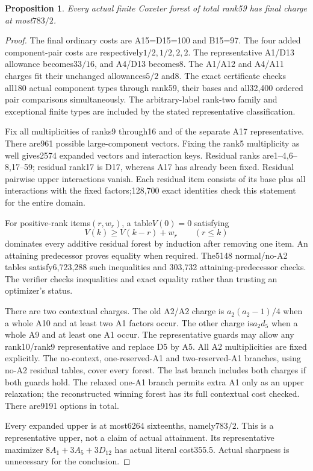\documentclass[11pt]{article}
\newtheorem{proposition}[theorem]{Proposition}
\theoremstyle{remark}\newtheorem{remark}[theorem]{Remark}
\begin{document}
\begin{proposition}\label{prop:finite}
Every actual finite Coxeter forest of total rank59 has final charge
at most$783/2$.
\end{proposition}
\begin{proof}
The final ordinary costs are A15=D15=100 and B15=97. The four added
component-pair costs are respectively$1/2,1/2,2,2$. The representative
A1/D13 allowance becomes$33/16$, and A4/D13 becomes8. The A1/A12 and
A4/A11 charges fit their unchanged allowances$5/2$ and8. The exact
certificate checks all180 actual component types through rank59,
their bases and all32,400 ordered pair comparisons simultaneously.
The arbitrary-label rank-two family and exceptional finite types are
included by the stated representative classification.

Fix all multiplicities of ranks9 through16 and of the separate A17
representative. There are961 possible large-component vectors.
Fixing the rank5 multiplicity as well gives2574 expanded vectors and
interaction keys. Residual ranks are1--4,6--8,17--59; residual rank17
is D17, whereas A17 has already been fixed. Residual pairwise upper
interactions vanish. Each residual item consists of its base plus
all interactions with the fixed factors;128,700 exact identities
check this statement for the entire domain.

For positive-rank items$(r,w_r)$, a table$V(0)=0$ satisfying
\[
 V(k)\geq V(k-r)+w_r\qquad(r\leq k)
\]
dominates every additive residual forest by induction after removing
one item. An attaining predecessor proves equality when required.
The5148 normal/no-A2 tables satisfy6,723,288 such inequalities and
303,732 attaining-predecessor checks. The verifier checks inequalities
and exact equality rather than trusting an optimizer's status.

There are two contextual charges. The old A2/A2 charge is
$a_2(a_2-1)/4$ when a whole A10 and at least two A1 factors occur.
The other charge is$a_2d_5$ when a whole A9 and at least one A1 occur.
The representative guards may allow any rank10/rank9 representative
and replace D5 by A5. All A2 multiplicities are fixed explicitly.
The no-context, one-reserved-A1 and two-reserved-A1 branches, using
no-A2 residual tables, cover every forest. The last branch includes
both charges if both guards hold. The relaxed one-A1 branch permits
extra A1 only as an upper relaxation; the reconstructed winning forest
has its full contextual cost checked. There are9191 options in total.

Every expanded upper is at most6264 sixteenths, namely$783/2$.
This is a representative upper, not a claim of actual attainment.
Its representative maximizer $8A_1+3A_5+3D_{12}$ has actual literal
cost355.5. Actual sharpness is unnecessary for the conclusion.
\end{proof}
\end{document}
